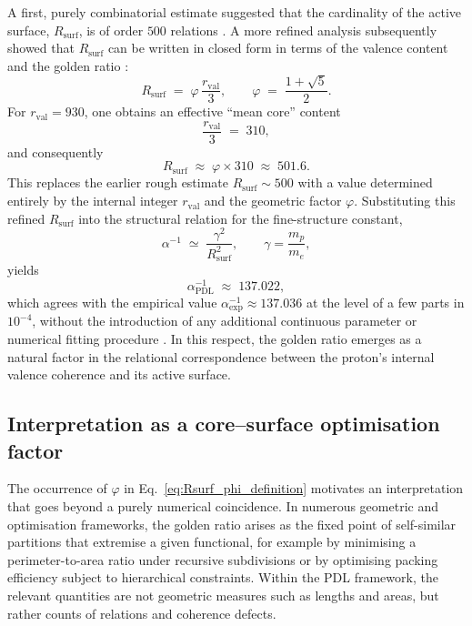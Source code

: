 \documentclass[11pt,a4paper]{article}
\numberwithin{equation}{section}
\begin{document}
A first, purely combinatorial estimate suggested that the cardinality of the active surface, $R_{\mathrm{surf}}$, is of order $500$ relations \cite{LaubscherPDLFull2026,LaubscherLDP2026}. A more refined analysis subsequently showed that $R_{\mathrm{surf}}$ can be written in closed form in terms of the valence content and the golden ratio \cite{LaubscherDerivationAlpha2026,LaubscherGoldenRatioPDL2026}:
\begin{equation}
  R_{\mathrm{surf}} \;=\; \varphi\,\frac{r_{\mathrm{val}}}{3},
  \qquad
  \varphi \;=\; \frac{1+\sqrt{5}}{2}.
  \label{eq:Rsurf_phi_definition}
\end{equation}
For $r_{\mathrm{val}}=930$, one obtains an effective ``mean core'' content
\begin{equation}
  \frac{r_{\mathrm{val}}}{3} \;=\; 310,
\end{equation}
and consequently
\begin{equation}
  R_{\mathrm{surf}} \;\approx\; \varphi \times 310 \;\approx\; 501.6.
\end{equation}
This replaces the earlier rough estimate $R_{\mathrm{surf}}\sim 500$ with a value determined entirely by the internal integer $r_{\mathrm{val}}$ and the geometric factor $\varphi$. Substituting this refined $R_{\mathrm{surf}}$ into the structural relation for the fine-structure constant,
\begin{equation}
  \alpha^{-1} \;\simeq\; \frac{\gamma^2}{R_{\mathrm{surf}}^2},
  \qquad
  \gamma = \frac{m_p}{m_e},
\end{equation}
yields
\begin{equation}
  \alpha^{-1}_{\mathrm{PDL}} \;\approx\; 137.022,
\end{equation}
which agrees with the empirical value $\alpha^{-1}_{\mathrm{exp}}\approx 137.036$ at the level of a few parts in $10^{-4}$, without the introduction of any additional continuous parameter or numerical fitting procedure \cite{LaubscherDerivationAlpha2026,LaubscherGoldenRatioPDL2026}. In this respect, the golden ratio emerges as a natural factor in the relational correspondence between the proton’s internal valence coherence and its active surface.

\subsection{Interpretation as a core--surface optimisation factor}
\label{subsec:phi_optimisation}

The occurrence of $\varphi$ in Eq.~\eqref{eq:Rsurf_phi_definition} motivates an interpretation that goes beyond a purely numerical coincidence. In numerous geometric and optimisation frameworks, the golden ratio arises as the fixed point of self-similar partitions that extremise a given functional, for example by minimising a perimeter-to-area ratio under recursive subdivisions or by optimising packing efficiency subject to hierarchical constraints. Within the PDL framework, the relevant quantities are not geometric measures such as lengths and areas, but rather counts of relations and coherence defects.
\end{document}
